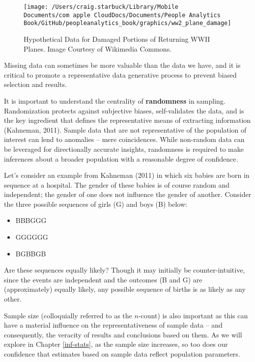\documentclass[
]{book}
\providecommand{\tightlist}{%
  \setlength{\itemsep}{0pt}\setlength{\parskip}{0pt}}
\begin{document}
\begin{figure}

{\centering \texttt{[image: /Users/craig.starbuck/Library/Mobile Documents/com~apple~CloudDocs/Documents/People Analytics Book/GitHub/peopleanalytics\_book/graphics/ww2\_plane\_damage]} 

}

\caption{Hypothetical Data for Damaged Portions of Returning WWII Planes. Image Courtesy of Wikimedia Commons.}\label{fig:ww2-plane-damage}
\end{figure}

Missing data can sometimes be more valuable than the data we have, and it is critical to promote a representative data generative process to prevent biased selection and results.

It is important to understand the centrality of \textbf{randomness} in sampling. Randomization protects against subjective biases, self-validates the data, and is the key ingredient that defines the representative means of extracting information (Kahneman, 2011). Sample data that are not representative of the population of interest can lend to anomalies -- mere coincidences. While non-random data can be leveraged for directionally accurate insights, randomness is required to make inferences about a broader population with a reasonable degree of confidence.

Let's consider an example from Kahneman (2011) in which six babies are born in sequence at a hospital. The gender of these babies is of course random and independent; the gender of one does not influence the gender of another. Consider the three possible sequences of girls (G) and boys (B) below:

\begin{itemize}
\tightlist
\item
  BBBGGG
\item
  GGGGGG
\item
  BGBBGB
\end{itemize}

Are these sequences equally likely? Though it may initially be counter-intuitive, since the events are independent and the outcomes (B and G) are (approximately) equally likely, any possible sequence of births is as likely as any other.

Sample size (colloquially referred to as the \(n\)-count) is also important as this can have a material influence on the representativeness of sample data -- and consequently, the veracity of results and conclusions based on them. As we will explore in Chapter \ref{inf-stats}, as the sample size increases, so too does our confidence that estimates based on sample data reflect population parameters.
\end{document}
